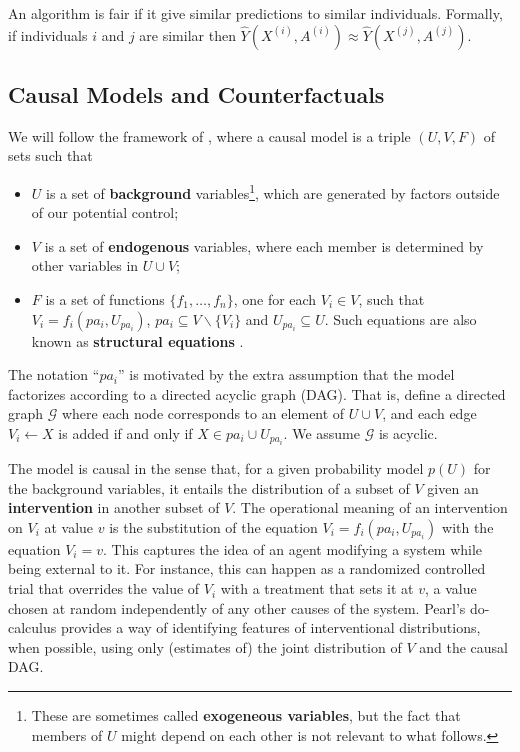 \begin{define}
An algorithm is fair if it give similar predictions to similar individuals. Formally, if individuals $i$ and $j$ are similar then $\hat{Y}(X^{(i)}, A^{(i)}) \approx \hat{Y}(X^{(j)}, A^{(j)})$.
\end{define}


\subsection{Causal Models and Counterfactuals}
\label{subsec:cmc}
We will follow the framework of \cite{pearl:00}, where a causal
model is a triple $(U, V, F)$ of sets such that
\begin{itemize}
\item $U$ is a set of {\bf background} variables\footnote{These are
  sometimes called {\bf exogeneous variables}, but the fact that members of $U$
  might depend on each other is not relevant to what follows.}, which are generated by factors
outside of our potential control;
\item $V$ is a set of {\bf endogenous} variables, where each member is determined by
  other variables in $U \cup V$;
\item $F$ is a set of functions $\{f_1, \dots, f_n\}$, one for each $V_i \in V$, such
that $V_i = f_i(pa_i, U_{pa_i})$, $pa_i \subseteq V \backslash
\{V_i\}$ and $U_{pa_i} \subseteq U$. Such equations are also known as
{\bf structural equations} \citep{bol:89}.
\end{itemize}

The notation ``$pa_i$'' is motivated by the extra assumption that the
model factorizes according to a directed acyclic graph (DAG). That is,
define a directed graph $\mathcal G$ where each node corresponds to an
element of $U \cup V$, and each edge $V_i \leftarrow X$ is added if
and only if $X \in pa_i \cup U_{pa_i}$. We assume $\mathcal G$ is
acyclic.

The model is causal in the sense that, for a given probability model
$p(U)$ for the background variables, it entails the distribution of a
subset of $V$ given an {\bf intervention} in another subset of $V$.
The operational meaning of an intervention on $V_i$ at value $v$ is
the substitution of the equation $V_i = f_i(pa_i, U_{pa_i})$ with the
equation $V_i = v$. This captures the idea of an agent modifying a
system while being external to it. For instance, this can happen as a
randomized controlled trial that overrides the value of $V_i$ with a
treatment that sets it at $v$, a value chosen at random independently
of any other causes of the system. Pearl's do-calculus
\citep{pearl:00} provides a way of identifying features of 
interventional distributions, when possible, using only (estimates of) the joint
distribution of $V$ and the causal DAG.

